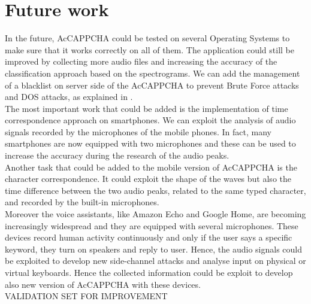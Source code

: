 \chapter{Future work}\label{chapter:Future}
In the future, AcCAPPCHA could be tested on several Operating Systems to make sure that it works correctly on all of them. The application could still be improved by collecting more audio files and increasing the accuracy of the classification approach based on the spectrograms. We can add the management of a blacklist on server side of the AcCAPPCHA to prevent Brute Force attacks and DOS attacks, as explained in .\\
The most important work that could be added is the implementation of time correspondence approach on smartphones. We can exploit the analysis of audio signals recorded by the microphones of the mobile phones. In fact, many smartphones are now equipped with two microphones and these can be used to increase the accuracy during the research of the audio peaks.\\
Another task that could be added to the mobile version of AcCAPPCHA is the character correspondence. It could exploit the shape of the waves but also the time difference between the two audio peaks, related to the same typed character, and  recorded by the built-in microphones\cite{smartphone_acoustic}. \\
Moreover the voice assistants, like Amazon Echo and Google Home, are becoming increasingly widespread and they are equipped with several microphones. These devices record human activity continuously and only if the user says a specific keyword, they turn on speakers and reply to user. Hence, the audio signals could be exploited to develop new side-channel attacks and analyse input on physical or virtual keyboards\cite{voice_assistant}. Hence the collected information could be exploit to develop also new version of AcCAPPCHA with these devices.\\
VALIDATION SET FOR IMPROVEMENT